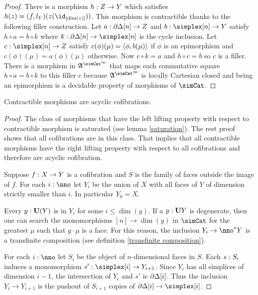 \documentclass[csh.tex]{subfiles}
\begin{document}
\begin{proof}
There is a morphism $h: Z\to Y$ which satisfies $h(z) = (f,l_Y)(z(\id_{[\dim(z)]}))$. This morphism is contractible thanks to the following filler construction. Let $a: \partial\Delta[n]\to Z$ and $b\of \simplex[n]\to Y$ satisfy $h\circ a = b\circ k$ where $k\of\cycle[n]\to\simplex[n]$ is the cycle inclusion. Let $c\of \simplex[n]\to Z$ satisfy $c(\phi)(\mu) = \left\langle \phi,b(\mu) \right\rangle$ if $\phi$ is an epimorphism and $c(\phi)(\mu) = a(\phi)(\mu)$ otherwise. Now $c\circ k = a$ and $h\circ c = b$ so $c$ is a filler. There is a morphism in $\ambient\s$ that maps each commutative square $h\circ a = b\circ k$ to this filler $c$ because $\ambient\s$ is locally Cartesian closed and being an epimorphism is a decidable property of morphisms of $\simCat$.
\end{proof}

\begin{lemma} Contractible morphisms are acyclic cofibrations.\label{Reedy}\end{lemma}

\begin{proof} The class of morphisms that have the left lifting property with respect to contractible morphism is saturated (see lemma \ref{saturation}). The rest proof shows that all cofibrations are in this class. That implies that all contractible morphisms have the right lifting property with respect to all cofibrations and therefore are acyclic cofibration.

Suppose $f: X\to Y$ is a cofibration and $S$ is the family of faces outside the image of $f$. For each $i\of\nno$ let $Y_i$ be the union of $X$ with all faces of $Y$ of dimension strictly smaller than $i$. In particular $Y_0=X$.

Every $y:\mathbf{U}(Y)$ is in $Y_i$ for some $i\leq \dim(y)$. If a $y:\mathbf{U} Y$ is degenerate, then one can search the monomorphisms $[n]\to\dim(y)$ in $\simCat$ for the greatest $\mu$ such that $y\cdot\mu$ is a face. For this reason, the inclusion $Y_i\to\nno\ri Y$ is a transfinite composition (see definition \ref{transfinite composition}).

For each $i\of\nno$ let $S_i$ be the object of $n$-dimensional faces in $S$. Each $s: S_i$ induces a monomorphism $s'\of\simplex[i]\to Y_{i+1}$. Since $Y_{i}$ has all simplices of dimension $i-1$, the intersection of $Y_i$ and $s'$ is $\partial\Delta[i]$. Thus the inclusion $Y_i\to Y_{i+1}$ is the pushout of $S_{i+1}$ copies of $\cycle[i]\to\simplex[i]$.
\end{proof}
\end{document}
